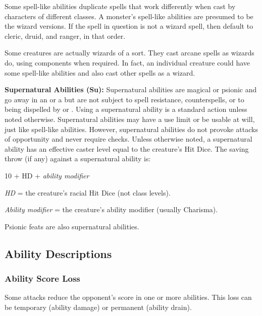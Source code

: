 Some spell-like abilities duplicate spells that work differently when cast by characters of different classes. A monster's spell-like abilities are presumed to be the wizard versions. If the spell in question is not a wizard spell, then default to cleric, druid, and ranger, in that order.

Some creatures are actually wizards of a sort. They cast arcane spells as wizards do, using components when required. In fact, an individual creature could have some spell-like abilities and also cast other spells as a wizard.

\textbf{Supernatural Abilities (Su):} Supernatural abilities are magical or psionic and go away in an  or a  but are not subject to spell resistance, counterspells, or to being dispelled by  or . Using a supernatural ability is a standard action unless noted otherwise. Supernatural abilities may have a use limit or be usable at will, just like spell-like abilities. However, supernatural abilities do not provoke attacks of opportunity and never require  checks. Unless otherwise noted, a supernatural ability has an effective caster level equal to the creature's Hit Dice. The saving throw (if any) against a supernatural ability is:

\begin{Formula*}{10 + \onehalf HD + \textit{ability modifier}}
	\item \textit{HD} = the creature's racial Hit Dice (not class levels).
	\item \textit{Ability modifier} = the creature's ability modifier (usually Charisma).
\end{Formula*}


Psionic feats are also supernatural abilities.



\subsection{Ability Descriptions}

\subsubsection{Ability Score Loss}
Some attacks reduce the opponent's score in one or more abilities. This loss can be temporary (ability damage) or permanent (ability drain).

